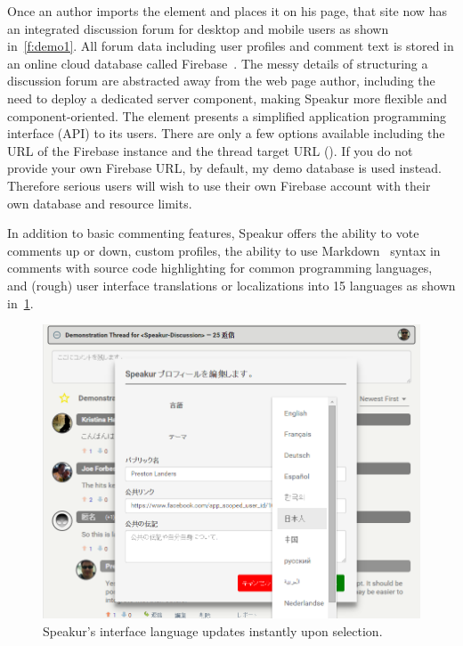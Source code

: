 Once an author imports the element and places it on his page, that site now has an integrated discussion forum for desktop and mobile users as shown in~\cref{f:demo1}. 
All forum data including user profiles and comment text is stored in an online cloud database called Firebase~\cite{firebasecontributors2015}.
The messy details of structuring a discussion forum are abstracted away from the web page author, including the need to deploy a dedicated server component, making Speakur more flexible and component-oriented.
The  element presents a simplified application programming interface (API) to its users.
There are only a few options available including the URL of the Firebase instance and the thread target URL ().
If you do not provide your own Firebase URL, by default, my demo database is used instead.
Therefore serious users will wish to use their own Firebase account with their own database and resource limits.

In addition to basic commenting features, 
Speakur offers the ability to vote comments up or down, custom profiles, 
the ability to use Markdown~\cite{githubcontributors2015} syntax in comments with  source code highlighting for common programming languages, 
and (rough) user interface translations  or localizations 
into 15 languages as shown in~\cref{f:lang}.

\begin{figure}[htb]
\centering
 \includegraphics[width=\textwidth]{images/screenshot_20150320_1923_lang.png}
\caption{Speakur's interface language updates instantly upon selection.}
\label{f:lang}
\end{figure}

